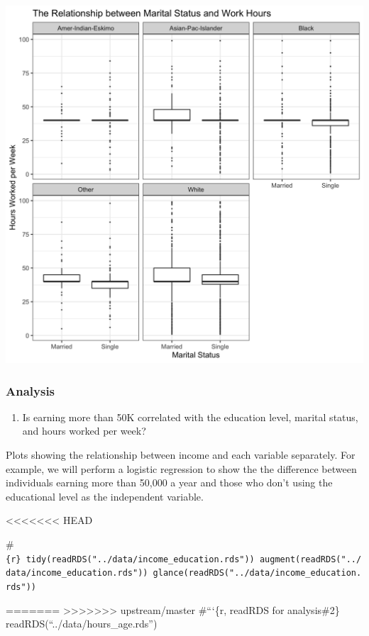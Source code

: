 \documentclass[]{article}
\providecommand{\tightlist}{%
  \setlength{\itemsep}{0pt}\setlength{\parskip}{0pt}}
\begin{document}
\includegraphics{../images/Plot_4_Marital_Status_and_Work_Hours.png}

\hypertarget{analysis}{%
\subsubsection{Analysis}\label{analysis}}

\begin{enumerate}
\def\labelenumi{\arabic{enumi}.}
\tightlist
\item
  Is earning more than 50K correlated with the education level, marital
  status, and hours worked per week?
\end{enumerate}

Plots showing the relationship between income and each variable
separately. For example, we will perform a logistic regression to show
the the difference between individuals earning more than 50,000 a year
and those who don't using the educational level as the independent
variable.

\textless\textless\textless\textless\textless\textless\textless{} HEAD

\#\texttt{\{r\}\ tidy(readRDS("../data/income\_education.rds"))\ augment(readRDS("../data/income\_education.rds"))\ glance(readRDS("../data/income\_education.rds"))}

=======
\textgreater\textgreater\textgreater\textgreater\textgreater\textgreater\textgreater{}
upstream/master \#```\{r, readRDS for analysis\#2\}
readRDS(``../data/hours\_age.rds'')
\end{document}
